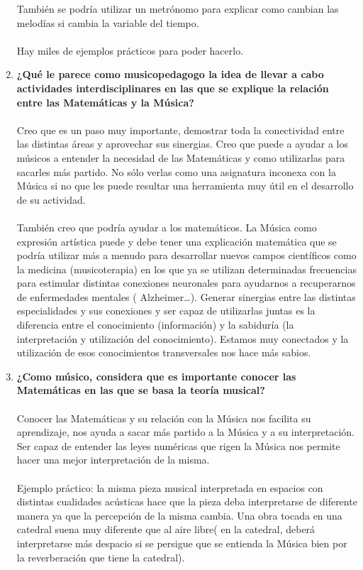 \documentclass[a4paper, openright, 11pt, titlepage]{report}
\theoremstyle{definition}\newtheorem{defin}[propo]{Definition}
\theoremstyle{definition}\newtheorem{obser}[propo]{Remark}
\theoremstyle{definition}\newtheorem{ejem}[propo]{Ejemplo}
\theoremstyle{definition}\newtheorem{algoritmo}[propo]{Algoritmo}
\begin{document}
\begin{enumerate}
    También se podría utilizar un metrónomo para explicar como cambian las melodías si cambia la variable del tiempo.\\\\
    Hay miles de ejemplos prácticos para poder hacerlo.
    \item \textbf{¿Qué le parece como musicopedagogo la idea de llevar a cabo actividades interdisciplinares en las que se explique la relación entre las Matemáticas y la Música?}\\\\
    Creo que es un paso muy importante, demostrar toda la conectividad entre las distintas áreas y aprovechar sus sinergias. Creo que puede a ayudar a los músicos a entender la necesidad de las Matemáticas y como utilizarlas para sacarles más partido. No sólo verlas como una asignatura inconexa con la Música si no que les puede resultar una herramienta muy útil en el desarrollo de su actividad.\\\\
    También creo que podría ayudar a los matemáticos. La Música como expresión artística puede y debe tener una explicación matemática que se podría utilizar más a menudo para desarrollar nuevos campos científicos como la medicina (musicoterapia) en los que ya se utilizan determinadas frecuencias para estimular distintas conexiones neuronales para ayudarnos a recuperarnos de enfermedades mentales ( Alzheimer…). Generar sinergias entre las distintas especialidades y sus conexiones y ser capaz de utilizarlas juntas es la diferencia entre el conocimiento (información) y la sabiduría  (la interpretación y utilización del conocimiento). Estamos muy conectados y la utilización de esos conocimientos transversales nos hace más sabios.
    \item \textbf{¿Como músico, considera que es importante conocer las Matemáticas en las que se basa la teoría musical?}\\\\
    Conocer las Matemáticas y su relación con la Música nos facilita su aprendizaje, nos ayuda a sacar más partido a la Música y a su interpretación. Ser capaz de entender las leyes numéricas que rigen la Música nos permite hacer una mejor interpretación de la misma.\\\\
    Ejemplo práctico: la misma pieza musical interpretada en espacios con distintas cualidades acústicas hace que la pieza deba interpretarse de diferente manera ya que la percepción de la misma cambia. 
    Una obra tocada en una catedral suena muy diferente que al aire libre( en la catedral, deberá interpretarse más despacio si se persigue que se entienda la Música bien por la reverberación que tiene la catedral).\\

\end{enumerate}
\end{document}
